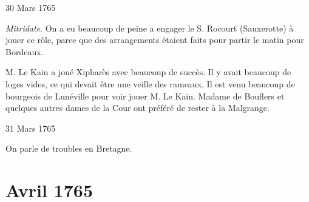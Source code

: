                      \begin{diary}{30 Mars 1765}{}
                        
                        
                           \emph{Mitridate}. On a eu beaucoup de peine a
                           engager le S. Rocourt
                           (Sauxerotte) à jouer ce
                           rôle, parce que des arrangements étaient faits
                           pour partir le matin pour Bordeaux. \bigskip
        
        
                        
                           M. Le Kain a joué Xipharès avec
                           beaucoup
                           de succès. Il y avait beaucoup de loges vides,
                           ce qui devait être une veille des rameaux.
                           Il est venu beaucoup de bourgeois de Lunéville
                           pour voir jouer M. Le Kain.
                              Madame de
                              Bouflers et quelques autres dames de la
                           Cour ont préféré de rester à la
                              Malgrange. \bigskip
        
        
                     \end{diary}

                     \begin{diary}{31 Mars 1765}{}
                        
                         On parle de troubles en Bretagne. \bigskip
        
        
                     \end{diary}
                  \chapter*{Avril 1765}
                     
                     
                     
